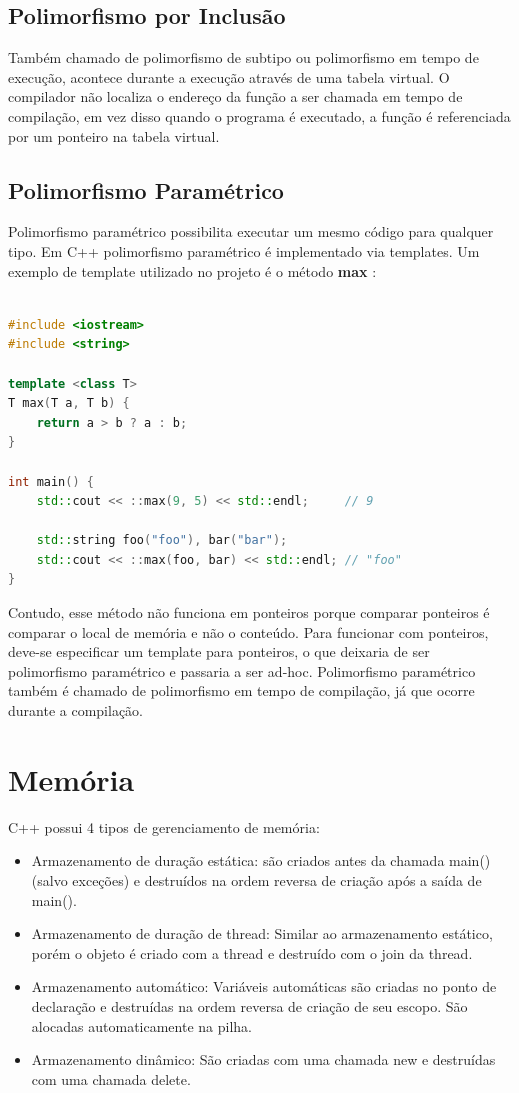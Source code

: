 \documentclass[rel_mlp]{iiufrgs}
\begin{document}
\subsection{Polimorfismo por Inclusão}
Também chamado de polimorfismo de subtipo ou polimorfismo em tempo de execução, acontece durante a execução através de uma tabela virtual. O compilador não localiza o endereço da função a ser chamada em tempo de compilação, em vez disso quando o programa é executado, a função é referenciada por um ponteiro na tabela virtual.
\subsection{Polimorfismo Paramétrico}
Polimorfismo paramétrico possibilita executar um mesmo código para qualquer tipo. Em C++ polimorfismo paramétrico é implementado via templates.
Um exemplo de template utilizado no projeto é o método \textbf{max} :

	\begin{lstlisting}[language=C++, caption={Método genérico para calcular o máximo entre dois argumentos genéricos}]

#include <iostream>
#include <string>

template <class T>
T max(T a, T b) {
	return a > b ? a : b;
}

int main() {
	std::cout << ::max(9, 5) << std::endl;     // 9
	
	std::string foo("foo"), bar("bar");
	std::cout << ::max(foo, bar) << std::endl; // "foo"
}

\end{lstlisting}

Contudo, esse método não funciona em ponteiros porque comparar ponteiros é comparar o local de memória e não o conteúdo. Para funcionar com ponteiros, deve-se especificar um template para ponteiros, o que deixaria de ser polimorfismo paramétrico e passaria a ser ad-hoc.
Polimorfismo paramétrico também é chamado de polimorfismo em tempo de compilação, já que ocorre durante a compilação.


\section{Memória}
C++ possui 4 tipos de gerenciamento de memória:
\begin{itemize}
	\item Armazenamento de duração estática: são criados antes da chamada main() (salvo exceções) e destruídos na ordem reversa de criação após a saída de main().
	\item Armazenamento de duração de thread: Similar ao armazenamento estático, porém o objeto é criado com a thread e destruído com o join da thread.
	\item Armazenamento automático: Variáveis automáticas são criadas no ponto de declaração e destruídas na ordem reversa de criação de seu escopo. São alocadas automaticamente na pilha.
	\item Armazenamento dinâmico: São criadas com uma chamada new e destruídas com uma chamada delete.
\end{itemize}
\end{document}
